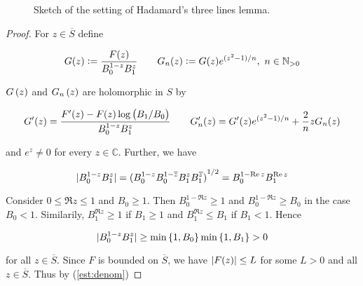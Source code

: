 \begin{figure}[h!tb]
	\centering
	\caption{Sketch of the setting of Hadamard's three lines lemma.}
	\label{fig:Hadamards_three_lines_lemma}
\end{figure}

\begin{proof}
For $z \in \overline{S}$ define 

\begin{equation*}
	G(z) := \frac{F(z)}{B_0^{1 - z}B_1^z} \qquad G_n(z) := G(z) e^{\del[0]{z^2 - 1}/n},~n \in\mathbb{N}_{>0}
\end{equation*}

$G\del{z}$ and $G_n\del{z}$ are holomorphic in $S$ by
	
\begin{equation*}
	G'(z) = \frac{F'(z) - F(z)\log\del{ B_1/B_0}}{B_0^{1 - z}B_1^z} \qquad G_n'(z) = G'(z)e^{\del[0]{z^2 - 1 }/n} + \frac{2}{n}zG_n(z)	
\end{equation*}

\noindent and $e^z \neq 0$ for every $z \in \mathbb{C}$. Further, we have

\begin{equation*}
	\abs[0]{B_0^{1 - z}B_1^z} = \del[0]{B_0^{1 - z}B_0^{1 - \overline{z}} B_1^z B_1^{\overline{z}}}^{1/2} =  B_0^{1 -\Re z}B_1^{\Re z}
\end{equation*}

Consider $0 \leq \Re z \leq 1$ and $B_0 \geq 1$. Then $B_0^{1 - \Re z} \geq 1$ and $B_0^{1 - \Re z } \geq B_0$ in the case $B_0 < 1$. Similarily, $B_1^{\Re z} \geq 1$ if $B_1 \geq 1$ and $B_1^{\Re z} \leq B_1$ if $B_1 < 1$. Hence 

\begin{equation}
	\abs[0]{B_0^{1 - z}B_1^z} \geq \min\cbr[0]{1,B_0}\min\cbr[0]{1,B_1} > 0
	\label{est:denom}
\end{equation}

\noindent for all $z \in \overline{S}$. Since $F$ is bounded on $\overline{S}$, we have $\abs[0]{F(z)} \leq L$ for some $L > 0$ and all $z \in \overline{S}$. Thus by (\ref{est:denom})


\end{proof}
